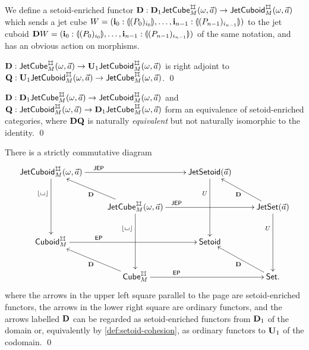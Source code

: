 \documentclass[a4paper]{memoir}
\begin{document}
\begin{definition} \label{def:jetcuboid-cohesion}
	We define a setoid-enriched functor $\setoiddisc : \setoiddisc_1 \jetcube{\myorix}{\mycubex}{M}{\vec a} \to \jetcuboid{\myorix}{\mycubex}{M}{\vec a}$ which sends a jet cube $W = (\mathbf{i}_0 : {\llparenthesis (P_0)_{i_0} \rrparenthesis}, \ldots, \mathbf{i}_{n-1} : {\llparenthesis (P_{n-1})_{i_{n-1}} \rrparenthesis})$ to the jet cuboid ${\mathbf{D}} W = (\mathbf{i}_0 : {\llparenthesis (P_0)_{i_0} \rrparenthesis}, \ldots, \mathbf{i}_{n-1} : {\llparenthesis (P_{n-1})_{i_{n-1}} \rrparenthesis})$ of the same notation, and has an obvious action on morphisms.
\end{definition}
\begin{corollary} \label{thm:jetcuboid-cohesion}
	$\setoiddisc : \jetcube{\myorix}{\mycubex}{M}{\vec a} \to \setoidfget_1 \jetcuboid{\myorix}{\mycubex}{M}{\vec a}$ is right adjoint to \\
	$\setoidquot : \setoidfget_1 \jetcuboid{\myorix}{\mycubex}{M}{\vec a} \to \jetcube{\myorix}{\mycubex}{M}{\vec a}$. \qed
\end{corollary}
\begin{corollary} \label{thm:jetcuboid-equiv-jetcube}
	$\setoiddisc : \setoiddisc_1 \jetcube{\myorix}{\mycubex}{M}{\vec a} \to \jetcuboid{\myorix}{\mycubex}{M}{\vec a}$ and $\setoidquot : \jetcuboid{\myorix}{\mycubex}{M}{\vec a} \to \setoiddisc_1 \jetcube{\myorix}{\mycubex}{M}{\vec a}$ form an equivalence of setoid-enriched categories, where ${\mathbf{D}} {\mathbf{Q}}$ is naturally \emph{equivalent} but not naturally isomorphic to the identity. \qed
\end{corollary}
\begin{corollary}
	There is a strictly commutative diagram
	\[
		\xymatrix{
			\jetcuboid{\myorix}{\mycubex}{M}{\vec a}
				\ar[rr]^(.3)\JEP
				\ar[dd]_(.3){\erasejc{\loch}}
				\ar@{<-}[rd]_{\setoiddisc}
			&&
			\jetsetoid{\vec a}
				\ar[dd]_(.3){U}
				\ar@{<-}[rd]_{\setoiddisc}
			\\
			&
			\jetcube{\myorix}{\mycubex}{M}{\vec a}
				\ar[rr]^(.3)\JEP
				\ar[dd]_(.3){\erasejc{\loch}}
			&&
			\jetset{\vec a}
				\ar[dd]_(.3){U}
			\\
			\cuboidcat^\mycubex_M
				\ar[rr]^(.3)\EP
				\ar@{<-}[rd]_{\setoiddisc}
			&&
			\Setoid
				\ar@{<-}[rd]_{\setoiddisc}
			\\
			&
			\cubecat^\mycubex_M
				\ar[rr]^(.3)\EP
			&&
			\Set.
		}
	\]
	where the arrows in the upper left square parallel to the page are setoid-enriched functors, the arrows in the lower right square are ordinary functors, and the arrows labelled ${\mathbf{D}}$ can be regarded as setoid-enriched functors from ${\mathbf{D}}_1$ of the domain or, equivalently by \cref{def:setoid-cohesion}, as ordinary functors to ${\mathbf{U}}_1$ of the codomain. \qed
\end{corollary}
\end{document}
